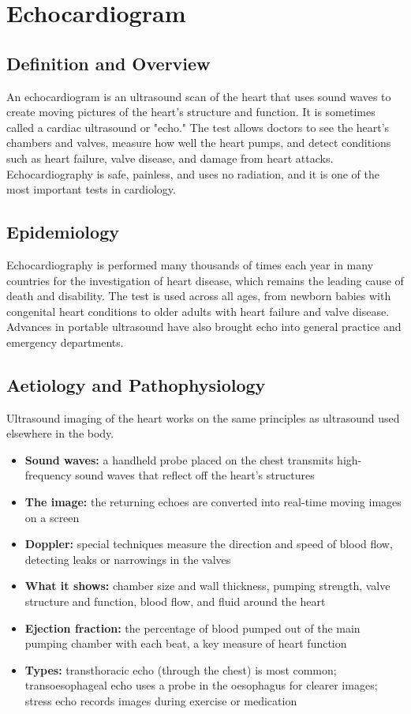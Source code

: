 \chapter{Echocardiogram}

\section*{Definition and Overview}
An echocardiogram is an ultrasound scan of the heart that uses sound waves to create moving pictures of the heart's structure and function. It is sometimes called a cardiac ultrasound or "echo." The test allows doctors to see the heart's chambers and valves, measure how well the heart pumps, and detect conditions such as heart failure, valve disease, and damage from heart attacks. Echocardiography is safe, painless, and uses no radiation, and it is one of the most important tests in cardiology.

\section*{Epidemiology}
Echocardiography is performed many thousands of times each year in many countries for the investigation of heart disease, which remains the leading cause of death and disability. The test is used across all ages, from newborn babies with congenital heart conditions to older adults with heart failure and valve disease. Advances in portable ultrasound have also brought echo into general practice and emergency departments.

\section*{Aetiology and Pathophysiology}
Ultrasound imaging of the heart works on the same principles as ultrasound used elsewhere in the body.
\begin{itemize}
    \item \textbf{Sound waves:} a handheld probe placed on the chest transmits high-frequency sound waves that reflect off the heart's structures
    \item \textbf{The image:} the returning echoes are converted into real-time moving images on a screen
    \item \textbf{Doppler:} special techniques measure the direction and speed of blood flow, detecting leaks or narrowings in the valves
    \item \textbf{What it shows:} chamber size and wall thickness, pumping strength, valve structure and function, blood flow, and fluid around the heart
    \item \textbf{Ejection fraction:} the percentage of blood pumped out of the main pumping chamber with each beat, a key measure of heart function
    \item \textbf{Types:} transthoracic echo (through the chest) is most common; transoesophageal echo uses a probe in the oesophagus for clearer images; stress echo records images during exercise or medication
\end{itemize}

